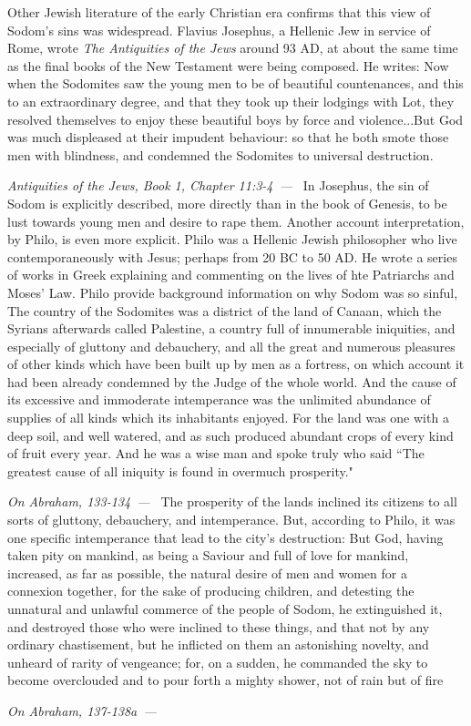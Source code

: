 \documentclass[10pt]{article}
\let\oldquote\quote
\let\endoldquote\endquote
\renewenvironment{quote}[2][]
  {\if\relax\detokenize{#1}\relax
     \def\quoteauthor{#2}%
   \else
     \def\quoteauthor{#2~---~#1}%
   \fi
   \oldquote}
  {\par\nobreak\smallskip\hfill\textit{\quoteauthor}%
   \endoldquote\addvspace{\bigskipamount}}
\begin{document}
Other Jewish literature of the early Christian era confirms that this view of Sodom's sins was widespread. Flavius Josephus, a Hellenic Jew in service of Rome, wrote \textit{The Antiquities of the Jews} around 93 AD, at about the same time as the final books of the New Testament were being composed. He writes:
\begin{quote}{Antiquities of the Jews, Book 1, Chapter 11:3-4}
Now when the Sodomites saw the young men to be of beautiful countenances, and this to an extraordinary degree, and that they took up their lodgings with Lot, they resolved themselves to enjoy these beautiful boys by force and violence...But God was much displeased at their impudent behaviour: so that he both smote those men with blindness, and condemned the Sodomites to universal destruction.
\end{quote}
In Josephus, the sin of Sodom is explicitly described, more directly than in the book of Genesis, to be lust towards young men and desire to rape them. Another account interpretation, by Philo, is even more explicit. Philo was a Hellenic Jewish philosopher who live contemporaneously with Jesus; perhaps from 20 BC to 50 AD. He wrote a series of works in Greek explaining and commenting on the lives of hte Patriarchs and Moses' Law. Philo provide background information on why Sodom was so sinful, 
\begin{quote}{On Abraham, 133-134}
The country of the Sodomites was a district of the land of Canaan, which the Syrians afterwards called Palestine, a country full of innumerable iniquities, and especially of gluttony and debauchery, and all the great and numerous pleasures of other kinds which have been built up by men as a fortress, on which account it had been already condemned by the Judge of the whole world. And the cause of its excessive and immoderate intemperance was the unlimited abundance of supplies of all kinds which its inhabitants enjoyed. For the land was one with a deep soil, and well watered, and as such produced abundant crops of every kind of fruit every year. And he was a wise man and spoke truly who said ``The greatest cause of all iniquity is found in overmuch prosperity." 
\end{quote}
The prosperity of the lands inclined its citizens to all sorts of gluttony, debauchery, and intemperance. But, according to Philo, it was one specific intemperance that lead to the city's destruction:
\begin{quote}{On Abraham, 137-138a}
But God, having taken pity on mankind, as being a Saviour and full of love for mankind, increased, as far as possible, the natural desire of men and women for a connexion together, for the sake of producing children, and detesting the unnatural and unlawful commerce of the people of Sodom, he extinguished it, and destroyed those who were inclined to these things, and that not by any ordinary chastisement, but he inflicted on them an astonishing novelty, and unheard of rarity of vengeance; for, on a sudden, he commanded the sky to become overclouded and to pour forth a mighty shower, not of rain but of fire
\end{quote}
\end{document}

